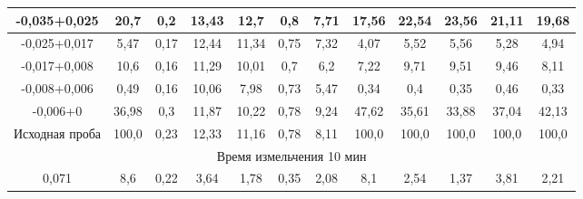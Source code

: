 {\begin{longtable}[c]{|p{}ccccccccccc|}
\multicolumn{1}{|c|}{-0,035+0,025} & \multicolumn{1}{c|}{20,7} & \multicolumn{1}{c|}{0,2} & \multicolumn{1}{c|}{13,43} & \multicolumn{1}{c|}{12,7} & \multicolumn{1}{c|}{0,8} & \multicolumn{1}{c|}{7,71} & \multicolumn{1}{c|}{17,56} & \multicolumn{1}{c|}{22,54} & \multicolumn{1}{c|}{23,56} & \multicolumn{1}{c|}{21,11} & 19,68 \\ \hline
\multicolumn{1}{|c|}{-0,025+0,017} & \multicolumn{1}{c|}{5,47} & \multicolumn{1}{c|}{0,17} & \multicolumn{1}{c|}{12,44} & \multicolumn{1}{c|}{11,34} & \multicolumn{1}{c|}{0,75} & \multicolumn{1}{c|}{7,32} & \multicolumn{1}{c|}{4,07} & \multicolumn{1}{c|}{5,52} & \multicolumn{1}{c|}{5,56} & \multicolumn{1}{c|}{5,28} & 4,94 \\ \hline
\multicolumn{1}{|c|}{-0,017+0,008} & \multicolumn{1}{c|}{10,6} & \multicolumn{1}{c|}{0,16} & \multicolumn{1}{c|}{11,29} & \multicolumn{1}{c|}{10,01} & \multicolumn{1}{c|}{0,7} & \multicolumn{1}{c|}{6,2} & \multicolumn{1}{c|}{7,22} & \multicolumn{1}{c|}{9,71} & \multicolumn{1}{c|}{9,51} & \multicolumn{1}{c|}{9,46} & 8,11 \\ \hline
\multicolumn{1}{|c|}{-0,008+0,006} & \multicolumn{1}{c|}{0,49} & \multicolumn{1}{c|}{0,16} & \multicolumn{1}{c|}{10,06} & \multicolumn{1}{c|}{7,98} & \multicolumn{1}{c|}{0,73} & \multicolumn{1}{c|}{5,47} & \multicolumn{1}{c|}{0,34} & \multicolumn{1}{c|}{0,4} & \multicolumn{1}{c|}{0,35} & \multicolumn{1}{c|}{0,46} & 0,33 \\ \hline
\multicolumn{1}{|c|}{-0,006+0} & \multicolumn{1}{c|}{36,98} & \multicolumn{1}{c|}{0,3} & \multicolumn{1}{c|}{11,87} & \multicolumn{1}{c|}{10,22} & \multicolumn{1}{c|}{0,78} & \multicolumn{1}{c|}{9,24} & \multicolumn{1}{c|}{47,62} & \multicolumn{1}{c|}{35,61} & \multicolumn{1}{c|}{33,88} & \multicolumn{1}{c|}{37,04} & 42,13 \\ \hline
\multicolumn{1}{|c|}{Исходная проба} & \multicolumn{1}{c|}{100,0} & \multicolumn{1}{c|}{0,23} & \multicolumn{1}{c|}{12,33} & \multicolumn{1}{c|}{11,16} & \multicolumn{1}{c|}{0,78} & \multicolumn{1}{c|}{8,11} & \multicolumn{1}{c|}{100,0} & \multicolumn{1}{c|}{100,0} & \multicolumn{1}{c|}{100,0} & \multicolumn{1}{c|}{100,0} & 100,0\\ \hline
\multicolumn{12}{|c|}{Время измельчения 10 мин} \\ \hline
\multicolumn{1}{|c|}{0,071} & \multicolumn{1}{c|}{8,6} & \multicolumn{1}{c|}{0,22} & \multicolumn{1}{c|}{3,64} & \multicolumn{1}{c|}{1,78} & \multicolumn{1}{c|}{0,35} & \multicolumn{1}{c|}{2,08} & \multicolumn{1}{c|}{8,1} & \multicolumn{1}{c|}{2,54} & \multicolumn{1}{c|}{1,37} & \multicolumn{1}{c|}{3,81} & 2,21 \\ \hline

\end{longtable}}
